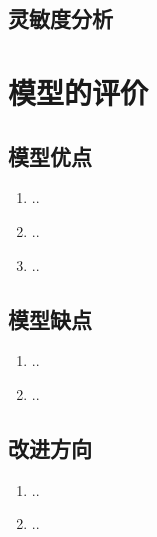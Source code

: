 \documentclass[withoutpreface,bwprint]{cumcmthesis} %
\begin{document}
\subsection{灵敏度分析}


\section{模型的评价}
\subsection{模型优点}
\begin{enumerate}
    \item ..
    \item ..
    \item ..
\end{enumerate}

\subsection{模型缺点}
\begin{enumerate}
    \item ..
    \item ..
\end{enumerate}

\subsection{改进方向}
\begin{enumerate}
    \item ..
    \item ..
\end{enumerate}



\end{document}
